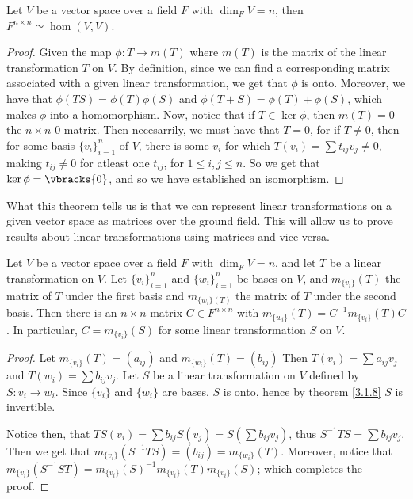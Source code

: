 \begin{theorem}\label{3.3.4}
    Let $V$ be a vector space over a field  $F$ with  $\dim_F{V}=n$, then $F^{n
    \times n} \simeq \hom{(V,V)}$.
\end{theorem}
\begin{proof}
    Given the map $\phi:T \rightarrow m(T)$ where $m(T)$ is the matrix of the
    linear transformation $T$ on $V$. By definition, since we can find a
    corresponding matrix associated with a given linear transformation, we get
    that $\phi$ is onto. Moreover, we have that  $\phi(TS)=\phi(T)\phi(S)$ and
    $\phi(T+S)=\phi(T)+\phi(S)$, which makes $\phi$ into a homomorphism. Now,
    notice that if  $T \in \ker{\phi}$, then $m(T)=0$ the $n \times n$  $0$
    matrix. Then necesarrily, we must have that  $T=0$, for if  $T \neq 0$, then
    for some basis  $\{v_i\}_{i=1}^n$ of $V$, there is some  $v_i$ for which
    $T(v_i)=\sum{t_{ij}v_j} \neq 0$, making $t_{ij} \neq 0$ for atleast one
    $t_{ij}$, for $1 \leq i,j \leq n$. So we get that  $\ker{\phi}=\vbracks{0}$,
    and so we have established an isomorphism.
\end{proof}
\begin{remark} 
    What this theorem tells us is that we can represent linear transformations
    on a given vector space as matrices over the ground field. This will allow
    us to prove results about linear transformations using matrices and vice
    versa.
\end{remark}

\begin{theorem}\label{3.3.5}
    Let $V$ be a vector space over a field $F$ with  $\dim_F{V}=n$, and let $T$
    be a linear transformation on $V$. Let $\{v_i\}_{i=1}^n$ and
    $\{w_i\}_{i=1}^n$ be bases on $V$, and  $m_{\{v_i\}}(T)$ the matrix of $T$ 
    under the first basis and $m_{\{w_i\}(T)}$ the matrix of $T$ under the
    second basis. Then there is an  $n \times n$ matrix  $C \in F^{n \times n}$
    with $m_{\{w_i\}}(T)=C^{-1}m_{\{v_i\}}(T)C$. In particular,
    $C=m_{\{v_i\}}(S)$ for some linear transformation $S$ on  $V$.
\end{theorem}
\begin{proof}
    Let $m_{\{v_i\}}(T)=(a_{ij})$ and $m_{\{w_i\}}(T)=(b_{ij})$ Then
    $T(v_i)=\sum{a_{ij}v_j}$ and $T(w_i)=\sum{b_{ij}v_j}$. Let $S$ be a linear
    transformation on  $V$ defined by  $S:v_i \rightarrow w_i$. Since $\{v_i\}$
    and $\{w_i\}$ are bases, $S$ is onto, hence by theorem \ref {3.1.8} $S$ is
    invertible.

    Notice then, that  $TS(v_i)=\sum{b_{ij}S(v_j)}=S(\sum{b_{ij}v_j})$, thus
    $S^{-1}TS=\sum{b_{ij}v_j}$. Then we get that
    $m_{\{v_i\}}(S^{-1}TS)=(b_{ij})=m_{\{w_i\}}(T)$. Moreover, notice that
    $m_{\{v_i\}}(S^{-1}ST)=m_{\{v_i\}}(S)^{-1}m_{\{v_i\}}(T)m_{\{v_i\}}(S)$;
    which completes the proof.
\end{proof}

